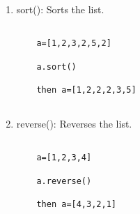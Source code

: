 \documentclass[12pt]{article}
\begin{document}
\begin{enumerate}
\begin{enumerate}
    \item sort(): Sorts the list. 
    
    \begin{verbatim}
     
    a=[1,2,3,2,5,2]
    
    a.sort()
    
    then a=[1,2,2,2,3,5]
    
    \end{verbatim}
    
    \item reverse(): Reverses the list.
    
    \begin{verbatim}
     
    a=[1,2,3,4]
    
    a.reverse()
    
    then a=[4,3,2,1]
    
    \end{verbatim}

  \end{enumerate}
     

\end{enumerate}
\end{document}

